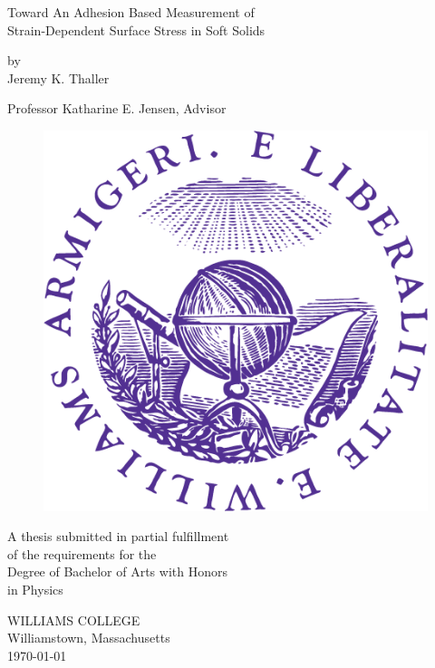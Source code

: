 \documentclass[12pt, oneside]{book}
\begin{document}
\begin{titlepage}
\begin{center}

\vspace*{.5cm}

{\huge Toward An Adhesion Based Measurement of \\\vspace{.4em} Strain-Dependent Surface Stress in Soft Solids} %

\vspace{2cm}

{\large by\\\vspace{.25em}Jeremy K. Thaller}

\vspace{2cm}
{Professor Katharine E. Jensen, Advisor}

\begin{figure}[h]
	\vspace{.5cm}
	\centering
	\includegraphics[width=.25\textwidth]{Chapters/Figures/seal.PNG}
\end{figure}  

\vfill

A thesis submitted in partial fulfillment\\
of the requirements for the\\
Degree of Bachelor of Arts with Honors\\
in Physics

\vspace*{3cm}

WILLIAMS COLLEGE\\
Williamstown, Massachusetts\\
\today %
\end{center}
\end{titlepage}
\end{document}
